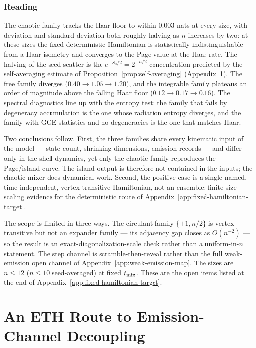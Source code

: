 \documentclass[12pt]{article}
\begin{document}
\subsubsection*{Reading}

The chaotic family tracks the Haar floor to within $0.003$ nats at every
size, with deviation and standard deviation both roughly halving as $n$
increases by two: at these sizes the fixed deterministic Hamiltonian is
statistically indistinguishable from a Haar isometry and converges to the
Page value at the Haar rate.  The halving of the seed scatter is the
$e^{-S_0/2}=2^{-n/2}$ concentration predicted by the self-averaging
estimate of Proposition~\ref{prop:self-averaging}
(Appendix~\ref{app:eth-decoupling}).  The free family diverges
($0.40\to1.05\to1.20$), and the integrable family plateaus an order of
magnitude above the falling Haar floor ($0.12\to0.17\to0.16$).  The spectral
diagnostics line up with the entropy test: the family that fails by
degeneracy accumulation is the one whose radiation entropy diverges, and the
family with GOE statistics and no degeneracies is the one that matches Haar.

Two conclusions follow.  First, the three families share every kinematic
input of the model --- state count, shrinking dimensions, emission records
--- and differ only in the shell dynamics, yet only the chaotic family
reproduces the Page/island curve.  The island output is therefore not
contained in the inputs; the chaotic mixer does dynamical work.  Second, the
positive case is a single named, time-independent, vertex-transitive
Hamiltonian, not an ensemble: finite-size-scaling evidence for the
deterministic route of Appendix~\ref{app:fixed-hamiltonian-target}.

The scope is limited in three ways.  The circulant family
$\{\pm1,n/2\}$ is vertex-transitive but not an expander family --- its
adjacency gap closes as $O(n^{-2})$ --- so the result is an
exact-diagonalization-scale check rather than a uniform-in-$n$ statement.
The step channel is scramble-then-reveal rather than the full weak-emission
open channel of Appendix~\ref{app:weak-emission-map}.  The sizes are
$n\le12$ ($n\le10$ seed-averaged) at fixed $t_{\rm mix}$.  These are the open
items listed at the end of Appendix~\ref{app:fixed-hamiltonian-target}.

\section{An ETH Route to Emission-Channel Decoupling}
\label{app:eth-decoupling}
\end{document}
